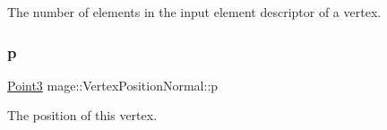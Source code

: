 The number of elements in the input element descriptor of a vertex. \hypertarget{structmage_1_1_vertex_position_normal_ac95e9941363ec5687f0bf21e59b83940}{}\label{structmage_1_1_vertex_position_normal_ac95e9941363ec5687f0bf21e59b83940} 
\subsubsection{\texorpdfstring{p}{p}}
{\footnotesize\ttfamily \hyperlink{structmage_1_1_point3}{Point3} mage\+::\+Vertex\+Position\+Normal\+::p}

The position of this vertex. 
